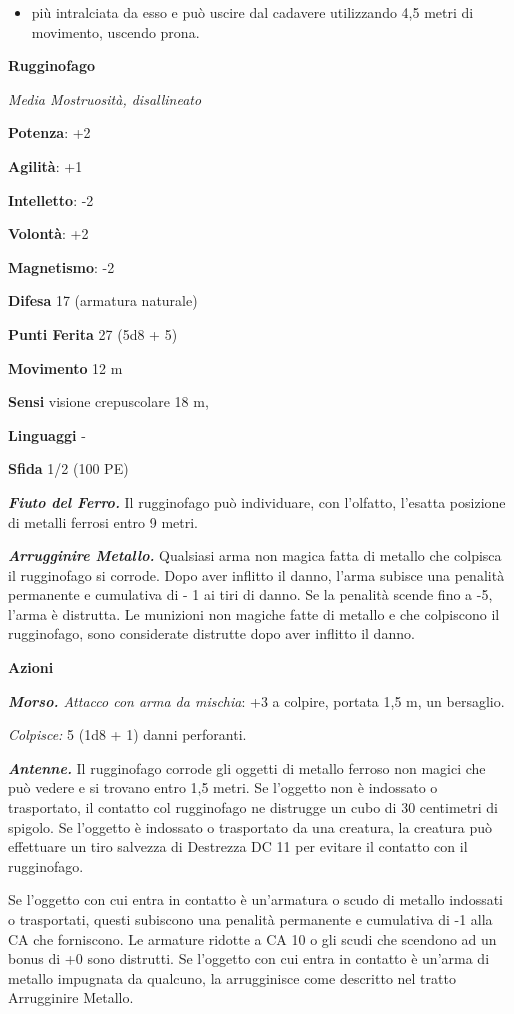 \begin{multicols}{2}
\begin{itemize}
\item
  più intralciata da esso e può uscire dal cadavere utilizzando 4,5
  metri di movimento, uscendo prona.
\end{itemize}

\textbf{Rugginofago}

\emph{Media Mostruosità, disallineato}

\textbf{Potenza}: +2

\textbf{Agilità}: +1

\textbf{Intelletto}: -2

\textbf{Volontà}: +2

\textbf{Magnetismo}: -2

\textbf{Difesa} 17 (armatura naturale)

\textbf{Punti Ferita} 27 (5d8 + 5)

\textbf{Movimento} 12 m

\textbf{Sensi} visione crepuscolare 18 m, 

\textbf{Linguaggi} -

\textbf{Sfida} 1/2 (100 PE)

\emph{\textbf{Fiuto del Ferro.}} Il rugginofago può individuare, con
l'olfatto, l'esatta posizione di metalli ferrosi entro 9 metri.

\emph{\textbf{Arrugginire Metallo.}} Qualsiasi arma non magica fatta di
metallo che colpisca il rugginofago si corrode. Dopo aver inflitto il
danno, l'arma subisce una penalità permanente e cumulativa di - 1 ai
tiri di danno. Se la penalità scende fino a -5, l'arma è distrutta. Le
munizioni non magiche fatte di metallo e che colpiscono il rugginofago,
sono considerate distrutte dopo aver inflitto il danno.

\textbf{Azioni}

\emph{\textbf{Morso.} Attacco con arma da mischia}: +3 a colpire,
portata 1,5 m, un bersaglio.

\emph{Colpisce:} 5 (1d8 + 1) danni perforanti.

\emph{\textbf{Antenne.}} Il rugginofago corrode gli oggetti di metallo
ferroso non magici che può vedere e si trovano entro 1,5 metri. Se
l'oggetto non è indossato o trasportato, il contatto col rugginofago ne
distrugge un cubo di 30 centimetri di spigolo. Se l'oggetto è indossato
o trasportato da una creatura, la creatura può effettuare un tiro
salvezza di Destrezza DC 11 per evitare il contatto con il rugginofago.

Se l'oggetto con cui entra in contatto è un'armatura o scudo di metallo
indossati o trasportati, questi subiscono una penalità permanente e
cumulativa di -1 alla CA che forniscono. Le armature ridotte a CA 10 o
gli scudi che scendono ad un bonus di +0 sono distrutti. Se l'oggetto
con cui entra in contatto è un'arma di metallo impugnata da qualcuno, la
arrugginisce come descritto nel tratto Arrugginire Metallo.


\end{multicols}
